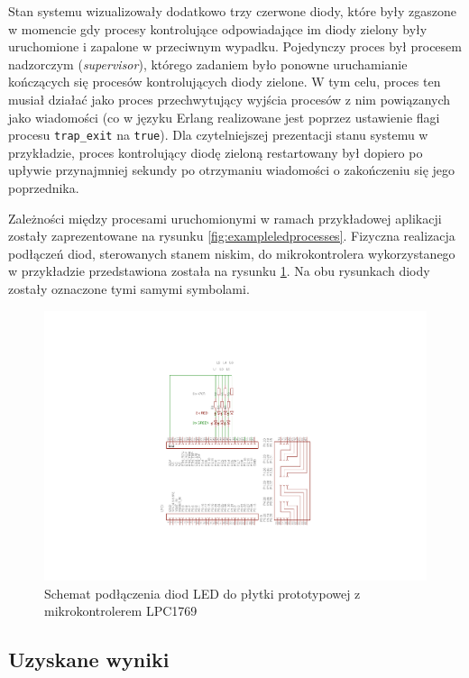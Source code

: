 Stan systemu wizualizowały dodatkowo trzy czerwone diody, które były zgaszone w momencie gdy procesy kontrolujące odpowiadające im diody zielony były uruchomione i zapalone w przeciwnym wypadku.
Pojedynczy proces był procesem nadzorczym (\emph{supervisor}), którego zadaniem było ponowne uruchamianie kończących się procesów kontrolujących diody zielone. W tym celu, proces ten musiał działać jako proces przechwytujący wyjścia procesów z nim powiązanych jako wiadomości (co w języku Erlang realizowane jest poprzez ustawienie flagi procesu \texttt{trap\_exit} na \texttt{true}).
Dla czytelniejszej prezentacji stanu systemu w przykładzie, proces kontrolujący diodę zieloną restartowany był dopiero po upływie przynajmniej sekundy po otrzymaniu wiadomości o zakończeniu się jego poprzednika.

Zależności między procesami uruchomionymi w ramach przykładowej aplikacji zostały zaprezentowane na rysunku \ref{fig:exampleledprocesses}. Fizyczna realizacja podłączeń diod, sterowanych stanem niskim, do mikrokontrolera wykorzystanego w przykładzie przedstawiona została na rysunku \ref{fig:exampleled}. Na obu rysunkach diody zostały oznaczone tymi samymi symbolami.



\begin{figure}[h]
\centerline{\includegraphics[scale=1, clip, trim=0mm 40mm 0mm 35mm]{example_led}}
\caption{Schemat podłączenia diod LED do płytki prototypowej z mikrokontrolerem LPC1769}
\label{fig:exampleled}
\end{figure}


\subsection{Uzyskane wyniki}

